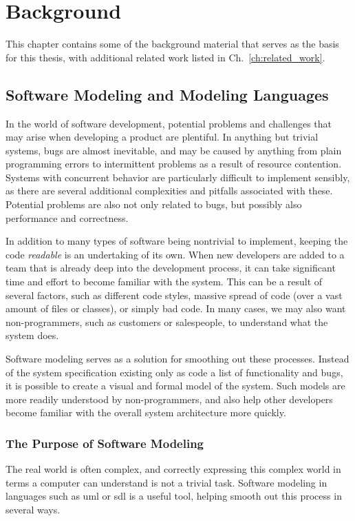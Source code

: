 \chapter{Background}
\label{ch:background}
This chapter contains some of the background material that serves as the basis for this thesis, with additional related work listed in Ch.~\ref{ch:related_work}. 

\section{Software Modeling and Modeling Languages}
\label{sec:software_modeling}
In the world of software development, potential problems and challenges that may arise when developing a product are plentiful. In anything but trivial systems, bugs are almost inevitable, and may be caused by anything from plain programming errors to intermittent problems as a result of resource contention. Systems with concurrent behavior are particularly difficult to implement sensibly, as there are several additional complexities and pitfalls associated with these. Potential problems are also not only related to bugs, but possibly also performance and correctness.

\noindent
In addition to many types of software being nontrivial to implement, keeping the code \emph{readable} is an undertaking of its own. When new developers are added to a team that is already deep into the development process, it can take significant time and effort to become familiar with the system. This can be a result of several factors, such as different code styles, massive spread of code (over a vast amount of files or classes), or simply bad code. In many cases, we may also want non-programmers, such as customers or salespeople, to understand what the system does.

\noindent
Software modeling serves as a solution for smoothing out these processes. Instead of the system specification existing only as code a list of functionality and bugs, it is possible to create a visual and formal model of the system. Such models are more readily understood by non-programmers, and also help other developers become familiar with the overall system architecture more quickly.

\subsection{The Purpose of Software Modeling}
\label{sec:software_modeling_purpose}
The real world is often complex, and correctly expressing this complex world in terms a computer can understand is not a trivial task. Software modeling in languages such as \gls{uml} or \gls{sdl} is a useful tool, helping smooth out this process in several ways.

